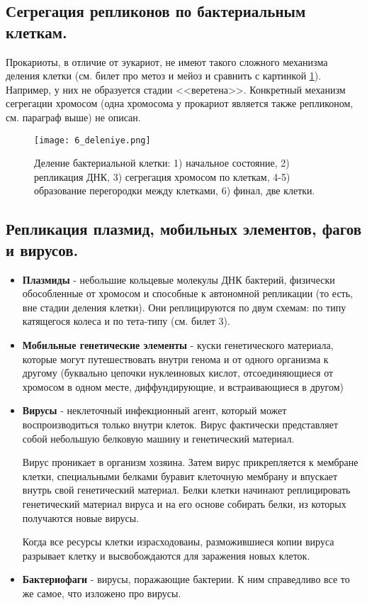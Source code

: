 \subsection{Сегрегация репликонов по бактериальным клеткам.}

Прокариоты, в отличие от эукариот, не имеют такого сложного механизма деления клетки (см. билет про метоз и мейоз и сравнить с картинкой \ref{fig:6_deleniye}). Например, у них не образуется стадии <<веретена>>. Конкретный механизм сегрегации хромосом (одна хромосома у прокариот является также репликоном, см. параграф выше) не описан. 

\begin{figure}[H]
    \centering
    \texttt{[image: 6\_deleniye.png]}
    \caption{Деление бактериальной клетки: 1)  начальное состояние, 2) репликация ДНК, 3) сегрегация хромосом по клеткам, 4-5) образование перегородки между клетками, 6) финал, две клетки.}
    \label{fig:6_deleniye}
\end{figure}

\subsection{Репликация плазмид, мобильных элементов, фагов и вирусов.}

\begin{itemize}
    \item \textbf{Плазмиды} - небольшие кольцевые молекулы ДНК бактерий, физически обособленные от хромосом и способные к автономной репликации (то есть, вне стадии деления клетки). Они реплицируются по двум схемам: по типу катящегося колеса и по тета-типу (см. билет 3).
    
    \item \textbf{Мобильные генетические элементы} - куски генетического материала, которые могут путешествовать внутри генома и от одного организма к другому (буквально цепочки нуклеиновых кислот, отсоединяющиеся от хромосом в одном месте, диффундирующие, и встраивающиеся в другом)
    
    \item \textbf{Вирусы} - неклеточный инфекционный агент, который может воспроизводиться только внутри клеток. Вирус фактически представляет собой небольшую белковую машину и генетический материал.
    
    Вирус проникает в организм хозяина. Затем вирус прикрепляется к мембране клетки, специальными белками буравит клеточную мембрану и впускает внутрь свой генетический материал. Белки клетки начинают реплицировать генетический материал вируса и на его основе собирать белки, из которых получаются новые вирусы. 
    
    Когда все ресурсы клетки израсходованы, разможившиеся копии вируса разрывает клетку и высвобождаются для заражения новых клеток.
    
    \item \textbf{Бактериофаги} - вирусы, поражающие бактерии. К ним справедливо все то же самое, что изложено про вирусы.
    
\end{itemize}

